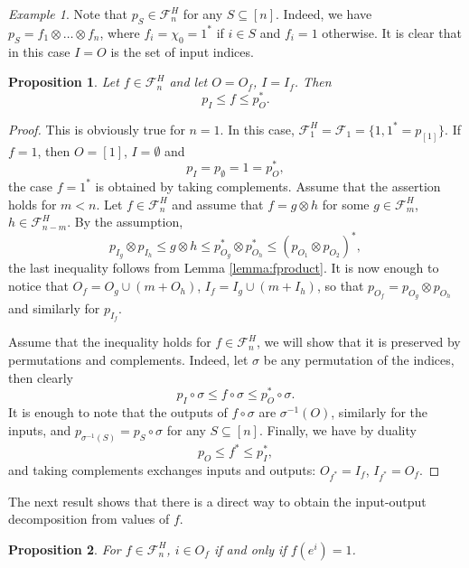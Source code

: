 \documentclass[12pt]{article}
\newtheorem{prop}{Proposition}
\theoremstyle{definition}
\theoremstyle{remark}
\newtheorem{example}{Example}
\def\Fe{\mathcal F}
\begin{document}
\begin{example}\label{ex:psh}  Note that $p_S\in \Fe_n^H$ for any $S\subseteq [n]$. 
Indeed, we have $p_S=f_1\otimes\dots \otimes f_n$, where
$f_i=\chi_0=1^*$ if $i\in S$ and $f_i=1$ otherwise. It is clear that in this case $I=O$ is
the set of input indices.


\end{example}



\begin{prop}\label{prop:fh_setting} Let $f\in \Fe_n^H$ and let $O=O_f$,  $I=I_f$. Then
\[
p_I\le f\le p_O^*.
\]

\end{prop}

\begin{proof} This is obviously true for $n=1$. In this case,
$\Fe_1^H=\Fe_1=\{1,1^*=p_{[1]}\}$. If $f=1$, then $O=[1]$, $I=\emptyset$ and 
\[
p_I=p_{\emptyset}=1=p_O^*,
\]
the case  $f=1^*$ is obtained by taking complements. Assume that the assertion holds for
$m<n$. Let $f\in \Fe^H_n$ and assume that  $f=g\otimes h$ for some  $g\in
\Fe_m^H$, $h\in \Fe_{n-m}^H$.  By the assumption,
\[
p_{I_g}\otimes p_{I_h}\le g\otimes h\le p^*_{O_g}\otimes p^*_{O_h}\le (p_{O_1}\otimes
p_{O_2})^*,
\]
the last inequality follows from Lemma \ref{lemma:fproduct}. It is now enough to notice that 
$O_f=O_g\cup (m+O_h)$, $I_f=I_g\cup (m+I_h)$, so that $p_{O_f}=p_{O_g}\otimes p_{O_h}$ and
similarly for $p_{I_f}$. 

Assume that the inequality holds for $f\in\Fe_n^H$, we will show that it is
preserved by permutations and complements. Indeed, let $\sigma$ be any
permutation of the indices, then clearly
\[
p_I\circ\sigma\le f\circ\sigma\le p_O^*\circ\sigma.
\]
It is enough to note that the outputs of $f\circ\sigma$ are $\sigma^{-1}(O)$, similarly
for the inputs, and $p_{\sigma^{-1}(S)}=p_S\circ\sigma$ for any $S\subseteq [n]$. 
Finally, we have by duality
\[
p_O\le f^* \le p_I^*,
\]
and taking complements exchanges inputs and outputs: $O_{f^*}=I_f$, $I_{f^*}=O_f$.






\end{proof}






The next result shows that there is a direct way to obtain the input-output decomposition
from values of 
$f$.

\begin{prop}\label{prop:fh_outputs} For $f\in \Fe_n^H$, $i\in O_f$ if and only if $f(e^i)=1$. 


\end{prop}
\end{document}
